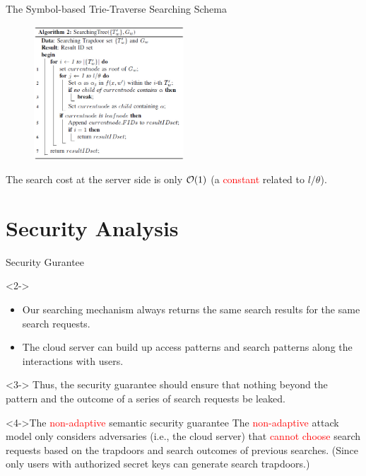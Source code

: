\documentclass[handout]{beamer}
\begin{document}
\begin{frame}{The Symbol-based Trie-Traverse Searching Schema}
	\begin{figure}
		\includegraphics[width=0.5\textwidth]{algo2.jpg}
	\end{figure}
     The search cost at the server side is only \textcolor{red}{${\cal O}(1)$} (a \textcolor{red}{constant} related to $l/\theta$).
\end{frame}

\section{Security Analysis}

\begin{frame}{Security Gurantee}
	\begin{block}<2->{}
		\begin{itemize}
			\item Our searching mechanism always returns the \textcolor{bazaar}{same} search results for the \textcolor{bazaar}{same} search requests.
			\item The cloud server can build up \textcolor[rgb]{0.0, 0.26, 0.15}{access patterns} and \textcolor[rgb]{0.0, 0.26, 0.15}{search patterns} along the interactions with users.
		\end{itemize}
	\end{block}
	
	\begin{alertblock}<3->{}
		Thus, the security guarantee should ensure that nothing beyond the \textcolor[rgb]{0.0, 0.26, 0.15}{pattern} and
		\textcolor[rgb]{0.0, 0.26, 0.15}{the outcome of a series of search requests} be leaked.
	\end{alertblock}
	\begin{block}<4->{The \textcolor{red}{non-adaptive} semantic security guarantee}
		The \textcolor{red}{non-adaptive} attack model only considers adversaries (i.e., the cloud server) that \textcolor{red}{cannot choose} search requests based on the trapdoors and search outcomes of previous searches. (Since only users with authorized secret keys can generate search trapdoors.)
	\end{block}
\end{frame}
\end{document}

